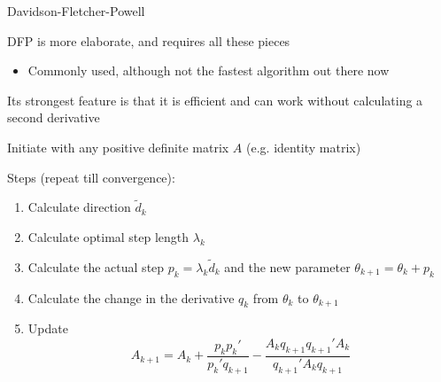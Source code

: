 \documentclass[notes,11pt, aspectratio=169]{beamer}
\newenvironment{wideitemize}{\itemize\addtolength{\itemsep}{10pt}}{\enditemize}
\begin{document}
  \begin{frame}{Davidson-Fletcher-Powell}
    \begin{wideitemize}
    \item DFP is more elaborate, and requires all these pieces
      \begin{itemize}
      \item Commonly used, although not the fastest algorithm out there now
      \end{itemize}
    \item Its strongest feature is that it is efficient and can work
      without calculating a second derivative
    \item Initiate with any positive definite matrix $A$
      (e.g. identity matrix)
    \item Steps (repeat till convergence):
      \begin{enumerate}
      \item Calculate direction $\tilde{d}_{k}$
      \item Calculate optimal step length $\lambda_{k}$
      \item Calculate the actual step
        $p_{k} = \lambda_{k}\tilde{d}_{k}$ and the new parameter
        $\theta_{k+1} = \theta_{k}+ p_{k}$
      \item Calculate the change in the derivative $q_{k}$ from
        $\theta_{k}$ to $\theta_{k+1}$
      \item Update
        $$A_{k+1} = A_{k} + \frac{p_{k}p_{k}'}{p_{k}'q_{k+1}} - \frac{A_{k}q_{k+1}q_{k+1}'A_{k}}{q_{k+1}'A_{k}q_{k+1}}$$
      \end{enumerate}
    \end{wideitemize}
  \end{frame}
\end{document}
